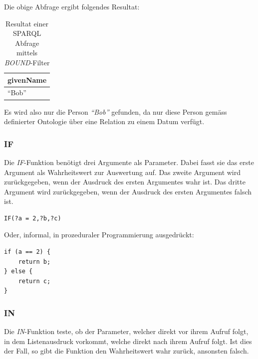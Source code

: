 Die obige Abfrage ergibt folgendes Resultat:
\noindent\hspace*{15mm}
\begin{table}[h]
    \centering
    \begin{tabular}{|l|}
        \hline
        \multicolumn{1}{|c|}{\textbf{givenName}} \\ \hline
        ``Bob''                    \\ \hline
    \end{tabular}
    \caption{Resultat einer SPARQL Abfrage mittels \textit{BOUND}-Filter\protect\footnotemark}
\end{table}

Es wird also nur die Person \textit{``Bob''} gefunden, da nur diese Person gemäss definierter Ontologie über eine Relation zu einem Datum verfügt.

\subsubsection{IF}
\label{subsec:sparql_ausdruecke_funktionen_if}
Die \textit{IF}-Funktion benötigt drei Argumente als Parameter. Dabei fasst sie das erste Argument als Wahrheitswert zur Auswertung auf. Das zweite Argument wird zurückgegeben, wenn der Ausdruck des ersten Argumentes wahr ist. Das dritte Argument wird zurückgegeben, wenn der Ausdruck des ersten Argumentes falsch ist.

\begin{lstlisting}
IF(?a = 2,?b,?c)
\end{lstlisting}

Oder, informal, in prozeduraler Programmierung ausgedrückt:
\begin{lstlisting}
if (a == 2) {
    return b;
} else {
    return c;
}
\end{lstlisting}

\subsubsection{IN}
\label{subsec:sparql_ausdruecke_funktionen_in}
Die \textit{IN}-Funktion teste, ob der Parameter, welcher direkt vor ihrem Aufruf folgt, in dem Listenausdruck vorkommt, welche direkt nach ihrem Aufruf folgt. Ist dies der Fall, so gibt die Funktion den Wahrheitswert wahr zurück, ansonsten falsch.

